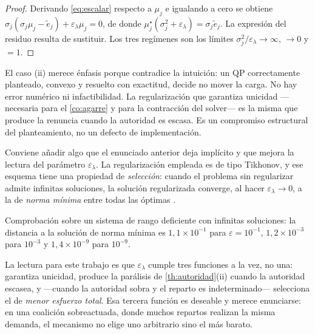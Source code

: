 \begin{proof}
Derivando \eqref{eq:escalar} respecto a $\mu_j$ e igualando a cero se obtiene
$\sigma_j(\sigma_j\mu_j-\tilde e_j)+\varepsilon_\lambda\mu_j=0$, de donde
$\mu_j^{\star}(\sigma_j^{2}+\varepsilon_\lambda)=\sigma_j\tilde e_j$. La
expresión del residuo resulta de sustituir. Los tres regímenes son los límites
$\sigma_j^2/\varepsilon_\lambda\to\infty$, $\to0$ y $=1$.
\end{proof}

\begin{observacion}
\label{obs:paralisis}
El caso (ii) merece énfasis porque contradice la intuición: un QP correctamente
planteado, convexo y resuelto con exactitud, decide no mover la carga. No hay
error numérico ni infactibilidad. La regularización que garantiza unicidad
—necesaria para el \cref{co:agarre} y para la contracción del solver— es la
misma que produce la renuncia cuando la autoridad es escasa. Es un compromiso
estructural del planteamiento, no un defecto de implementación.
\end{observacion}

\begin{observacion}
\label{obs:tikhonov-selecciona}
Conviene añadir algo que el enunciado anterior deja implícito y que mejora la
lectura del parámetro $\varepsilon_\lambda$. La regularización empleada es de
tipo Tikhonov, y ese esquema tiene una propiedad de \emph{selección}: cuando el
problema sin regularizar admite infinitas soluciones, la solución regularizada
converge, al hacer $\varepsilon_\lambda\to0$, a la de \emph{norma mínima} entre
todas las óptimas \cite{clempner2024optimization}.

Comprobación sobre un sistema de rango deficiente con infinitas soluciones: la
distancia a la solución de norma mínima es $1{,}1\times10^{-1}$ para
$\varepsilon=10^{-1}$, $1{,}2\times10^{-3}$ para $10^{-3}$ y
$1{,}4\times10^{-9}$ para $10^{-9}$.

La lectura para este trabajo es que $\varepsilon_\lambda$ cumple tres funciones a
la vez, no una: garantiza unicidad, produce la parálisis de
\cref{th:autoridad}(ii) cuando la autoridad escasea, y —cuando la autoridad
sobra y el reparto es indeterminado— selecciona el de \emph{menor esfuerzo total}.
Esa tercera función es deseable y merece enunciarse: en una coalición
sobreactuada, donde muchos repartos realizan la misma demanda, el mecanismo no
elige uno arbitrario sino el más barato.
\end{observacion}

